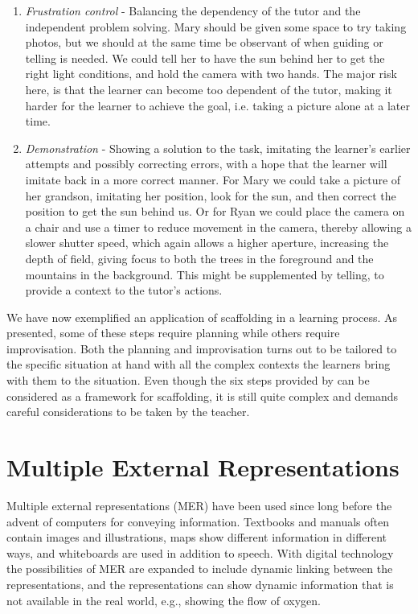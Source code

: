 \begin{enumerate}
\item{} \emph{Frustration control} - Balancing the dependency of the tutor and the independent problem solving. Mary should be given some space to try taking photos, but we should at the same time be observant of when guiding or telling is needed. We could tell her to have the sun behind her to get the right light conditions, and hold the camera with two hands. The major risk here, is that the learner can become too dependent of the tutor, making it harder for the learner to achieve the goal, i.e. taking a picture alone at a later time.  
\item{}  \emph{Demonstration} - Showing a solution to the task, imitating the learner's earlier attempts and possibly correcting errors, with a hope that the learner will imitate back in a more correct manner. For Mary we could take a picture of her grandson, imitating her position, look for the sun, and then correct the position to get the sun behind us. Or for Ryan we could place the camera on a chair and use a timer to reduce movement in the camera, thereby allowing a slower shutter speed, which again allows a higher aperture, increasing the depth of field, giving focus to both the trees in the foreground and the mountains in the background. This might be supplemented by telling, to provide a context to the tutor's actions.
\end{enumerate}

We have now exemplified an application of scaffolding in a learning process. As presented, some of these steps require planning while others require improvisation. Both the planning and improvisation turns out to be tailored to the specific situation at hand with all the complex contexts the learners bring with them to the situation. Even though the six steps provided by \citet{wood1976role} can be considered as a framework for scaffolding, it is still quite complex and demands careful considerations to be taken by the teacher.  







\section{Multiple External Representations}
Multiple external representations (MER) have been used since long before the advent of computers for conveying information. Textbooks and manuals often contain images and illustrations, maps show different information in different ways, and whiteboards are used in addition to speech. With digital technology the possibilities of MER are expanded to include dynamic linking between the representations, and the representations can show dynamic information that is not available in the real world, e.g., showing the flow of oxygen. 

